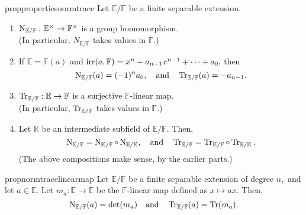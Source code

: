 \begin{restatable}[]{prop}{propertiesnormtrace}
\label{prop:propertiesnormtrace}
	Let $\mathbb{E}/\mathbb{F}$ be a finite separable extension.
	\begin{enumerate}
		\item $\operatorname{N}_{\mathbb{E}/\mathbb{F}} : \mathbb{E}^\times \to \mathbb{F}^\times$ is a group homomorphism. \\
		(In particular, $N_{\mathbb{E}/\mathbb{F}}$ takes values in $\mathbb{F}.$)
		\item If $\mathbb{E} = \mathbb{F}(a)$ and $\operatorname{irr}(a, \mathbb{F}) = x^n + a_{n - 1}x^{n - 1} + \cdots + a_0,$ then
		\begin{equation*} 
			\operatorname{N}_{\mathbb{E}/\mathbb{F}}(a) = (-1)^na_0, \quad\text{and}\quad \operatorname{Tr}_{\mathbb{E}/\mathbb{F}}(a) = -a_{n - 1}.
		\end{equation*}
		\item $\operatorname{Tr}_{\mathbb{E}/\mathbb{F}} : \mathbb{E} \to \mathbb{F}$ is a surjective $\mathbb{F}$-linear map. \\
		(In particular, $\operatorname{Tr}_{\mathbb{E}/\mathbb{F}}$ takes values in $\mathbb{F}.$) 
		\item Let $\mathbb{K}$ be an intermediate subfield of $\mathbb{E}/\mathbb{F}.$ Then,
		\begin{equation*} 
			\operatorname{N}_{\mathbb{E}/\mathbb{F}} = \operatorname{N}_{\mathbb{K}/\mathbb{F}} \circ \operatorname{N}_{\mathbb{E}/\mathbb{K}}, \quad\text{and}\quad \operatorname{Tr}_{\mathbb{E}/\mathbb{F}} = \operatorname{Tr}_{\mathbb{K}/\mathbb{F}} \circ \operatorname{Tr}_{\mathbb{E}/\mathbb{K}}.
		\end{equation*}
		(The above compositions make sense, by the earlier parts.) \hfill\hyperref[prop:propertiesnormtrace2]{\downsym}
	\end{enumerate} 
\end{restatable}

\begin{restatable}[]{prop}{normtracelinearmap}
\label{prop:normtracelinearmap}
	Let $\mathbb{E}/\mathbb{F}$ be a finite separable extension of degree $n,$ and let $a \in \mathbb{E}.$ Let $m_a : \mathbb{E} \to \mathbb{E}$ be the $\mathbb{F}$-linear map defined as $x \mapsto ax.$ Then,
	\begin{equation*} 
		\operatorname{N}_{\mathbb{E}/\mathbb{F}}(a) = \det(m_a) \quad\text{and}\quad \operatorname{Tr}_{\mathbb{E}/\mathbb{F}}(a) = \operatorname{Tr}(m_a).
	\end{equation*} \hfill\hyperref[prop:normtracelinearmap2]{\downsym}
\end{restatable}

